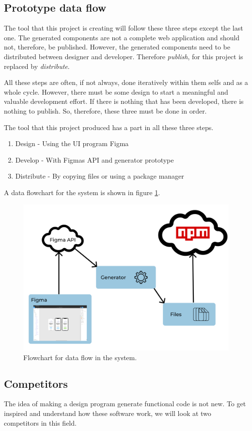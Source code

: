 \subsection{Prototype data flow}%
\label{sub:Prototype data flow}
The tool that this project is creating will follow these three steps except the last one. The generated components are not a complete web application and should not, therefore, be published. However, the generated components need to be distributed between designer and developer. Therefore \textit{publish}, for this project is replaced by \textit{distribute}. 

All these steps are often, if not always, done iteratively within them selfs and as a whole cycle. However, there must be some design to start a meaningful and valuable development effort. If there is nothing that has been developed, there is nothing to publish. So, therefore, these three must be done in order. 

The tool that this project produced has a part in all these three steps. 
\begin{enumerate}
  \item Design - Using the UI program Figma
  \item Develop - With Figmas API and generator prototype
  \item Distribute - By copying files or using a package manager 
\end{enumerate}
A data flowchart for the system is shown in figure \ref{fig:flow}.

\begin{figure}[H]
  \centering
  \includegraphics[width=0.8\linewidth]{images/flow2.png}
  \caption{Flowchart for data flow in the system.}%
  \label{fig:flow}
\end{figure}


\subsection{Competitors}%
\label{sub:Competitors}
The idea of making a design program generate functional code is not new. To get inspired and understand how these software work, we will look at two competitors in this field. 

